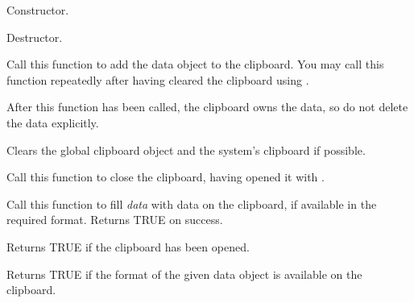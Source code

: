 
Constructor.



Destructor.

\label{wxclipboardadddata}


Call this function to add the data object to the clipboard. You may call
this function repeatedly after having cleared the clipboard using .

After this function has been called, the clipboard owns the data, so do not delete
the data explicitly.



\label{wxclipboardclear}


Clears the global clipboard object and the system's clipboard if possible.

\label{wxclipboardclose}


Call this function to close the clipboard, having opened it with .

\label{wxclipboardgetdata}


Call this function to fill {\it data} with data on the clipboard, if available in the required
format. Returns TRUE on success.

\label{wxclipboardisopened}


Returns TRUE if the clipboard has been opened.

\label{wxclipboardissupported}


Returns TRUE if the format of the given data object is available on the clipboard.


